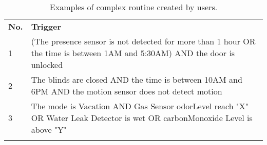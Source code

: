 \begin{table*}[t]
\centering
\scriptsize
\caption{{\small Examples of complex routine created by users.}}
\label{tbl:complex-routines}
\begin{tabular}{l|l}
\Xhline{2\arrayrulewidth}
{\bf No.}& {\bf Trigger}\\
\Xhline{2\arrayrulewidth}
1 & (The presence sensor is not detected for more than 1 hour OR the time is between 1AM and 5:30AM) AND the door is unlocked \\
2 & The blinds are closed AND the time is between 10AM and 6PM AND the motion sensor does not detect motion\\
3 & The mode is Vacation AND Gas Sensor odorLevel reach "X" OR Water Leak Detector is wet OR carbonMonoxide Level is above "Y"\\
\Xhline{2\arrayrulewidth}
\end{tabular}
\end{table*}
